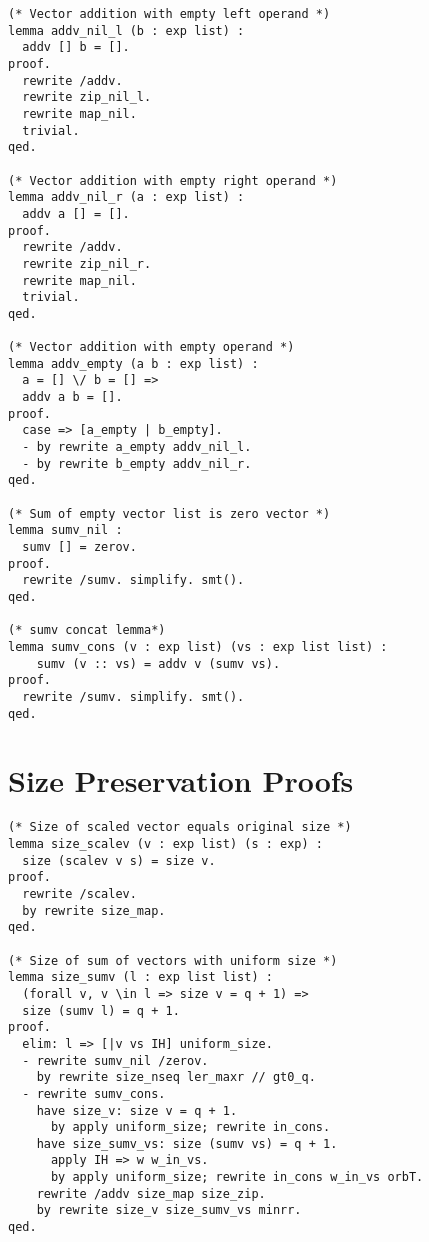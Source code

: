 \begin{lstlisting}[style=easycrypt, caption=Proof of Vector Addition Properties, breaklines=true, breakatwhitespace=true, frame=single, keepspaces=true]
(* Vector addition with empty left operand *)
lemma addv_nil_l (b : exp list) :
  addv [] b = [].
proof.
  rewrite /addv.
  rewrite zip_nil_l.
  rewrite map_nil.
  trivial.
qed.

(* Vector addition with empty right operand *)
lemma addv_nil_r (a : exp list) :
  addv a [] = [].
proof.
  rewrite /addv.
  rewrite zip_nil_r.
  rewrite map_nil.
  trivial.
qed.

(* Vector addition with empty operand *)
lemma addv_empty (a b : exp list) :
  a = [] \/ b = [] =>
  addv a b = [].
proof.
  case => [a_empty | b_empty].
  - by rewrite a_empty addv_nil_l.
  - by rewrite b_empty addv_nil_r.
qed.

(* Sum of empty vector list is zero vector *)
lemma sumv_nil :
  sumv [] = zerov.
proof.
  rewrite /sumv. simplify. smt().
qed.

(* sumv concat lemma*)
lemma sumv_cons (v : exp list) (vs : exp list list) :
    sumv (v :: vs) = addv v (sumv vs).
proof.
  rewrite /sumv. simplify. smt(). 
qed.
\end{lstlisting}

\section{Size Preservation Proofs}
\label{sec:size-preservation-proofs}

\begin{lstlisting}[style=easycrypt, caption=Proof of Size Preservation Properties, breaklines=true, breakatwhitespace=true, frame=single, keepspaces=true]
(* Size of scaled vector equals original size *)
lemma size_scalev (v : exp list) (s : exp) :
  size (scalev v s) = size v.
proof.
  rewrite /scalev.
  by rewrite size_map.
qed.

(* Size of sum of vectors with uniform size *)
lemma size_sumv (l : exp list list) :
  (forall v, v \in l => size v = q + 1) =>
  size (sumv l) = q + 1.
proof.
  elim: l => [|v vs IH] uniform_size.
  - rewrite sumv_nil /zerov.
    by rewrite size_nseq ler_maxr // gt0_q.
  - rewrite sumv_cons.
    have size_v: size v = q + 1.
      by apply uniform_size; rewrite in_cons.
    have size_sumv_vs: size (sumv vs) = q + 1.
      apply IH => w w_in_vs.
      by apply uniform_size; rewrite in_cons w_in_vs orbT.
    rewrite /addv size_map size_zip.
    by rewrite size_v size_sumv_vs minrr.
qed.
\end{lstlisting}


